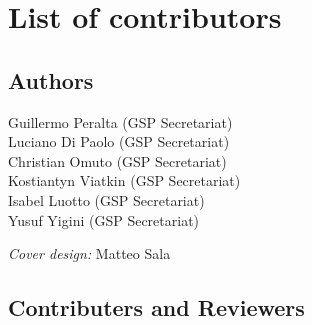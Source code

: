\documentclass[
  10pt,
  b5paper,
]{book}
\begin{document}
\mainmatter
\pagestyle{fancy}

\frontmatter
{}   
\tableofcontents
\listoffigures
\listoftables
\printnomenclature

\hypertarget{list-of-contributors}{%
\chapter*{List of contributors}\label{list-of-contributors}}

\hypertarget{authors}{%
\section*{Authors}\label{authors}}

Guillermo Peralta (GSP Secretariat)\\
Luciano Di Paolo (GSP Secretariat)\\
Christian Omuto (GSP Secretariat)\\
Kostiantyn Viatkin (GSP Secretariat)\\
Isabel Luotto (GSP Secretariat)\\
Yusuf Yigini (GSP Secretariat)

\emph{Cover design:} Matteo Sala

\hypertarget{contributers-and-reviewers}{%
\section*{Contributers and Reviewers}\label{contributers-and-reviewers}}
\end{document}
